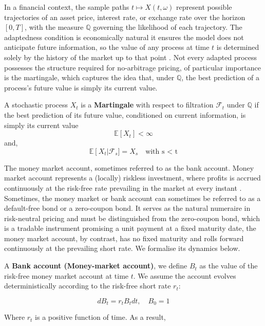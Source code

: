     \noindent
    In a financial context, the sample paths $t \mapsto X(t, \omega)$ represent possible trajectories of an asset price, interest rate, or exchange rate over the horizon $[0,T]$, with the measure $\mathbb{Q}$ governing the likelihood of each trajectory. The adaptedness condition is economically natural it ensures the model does not anticipate future information, so the value of any process at time $t$ is determined solely by the history of the market up to that point \cite{blyth2014introduction}. Not every adapted process possesses the structure required for no-arbitrage pricing, of particular importance is the martingale, which captures the idea that, under $\mathbb{Q}$, the best prediction of a process's future value is simply its current value.

    \begin{definition}[Martingale] \label{def:martingale}
        A stochastic process $X_t$ is a \textbf{Martingale}  with respect to filtration $\mathscr{F}_t$ under $\mathbb{Q}$ if the best prediction of its future value, conditioned on current information, is simply its current value
        \begin{equation}
            \mathbb{E} \left[ X_t\right] < \infty   
        \end{equation}    
        and, 
        \begin{equation}
            \mathbb{E} \left[ X_t\right | \mathscr{F}_s ] = X_s \quad  \text{with  s < t} 
        \end{equation}
            
    \end{definition}

    \noindent
     The money market account, sometimes referred to as the bank account. Money market account represents a (locally) riskless investment, where profits is accrued continuously at the risk-free rate prevailing in the market at every instant \cite{brigo2001interest}. Sometimes, the money market or bank account can sometimes be referred to as a default-free bond or a zero-coupon bond. It serves as the natural numeraire in risk-neutral pricing and must be distinguished from the zero-coupon bond, which is a tradable instrument promising a unit payment at a fixed maturity date, the money market account, by contrast, has no fixed maturity and rolls forward continuously at the prevailing short rate. We formalise its dynamics below. 

    \begin{definition}\label{def:bank_account}
    A \textbf{Bank account (Money-market account)}, we define $B_t$ as the value of the risk-free money market account at time $t$. We assume the account evolves  deterministically according to the risk-free short rate $r_t$:   

    \begin{equation}
        dB_t = r_tB_tdt, \quad B_0 = 1
    \end{equation}
    
    \end{definition}
    Where $r_t$ is a positive function of time. As a result, 


